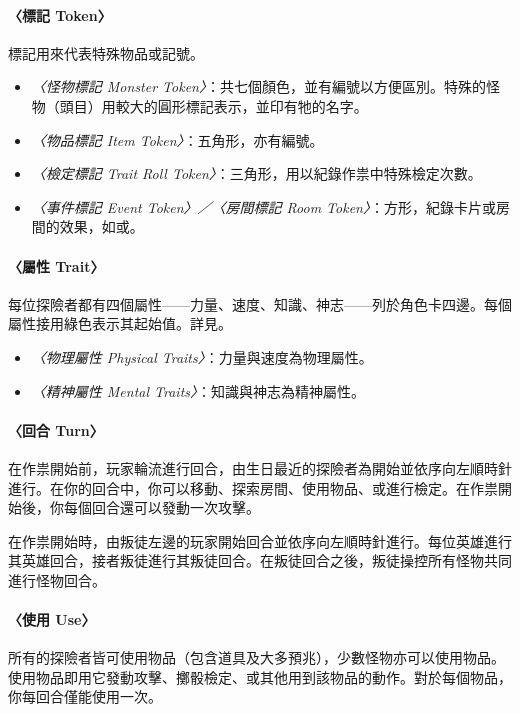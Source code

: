 \paragraph{〈標記 Token〉}
標記用來代表特殊物品或記號。

\begin{itemize}
  \item \textit{〈怪物標記 Monster Token〉}：共七個顏色，並有編號以方便區別。特殊的怪物（頭目）用較大的圓形標記表示，並印有牠的名字。
  \item \textit{〈物品標記 Item Token〉}：五角形，亦有編號。
  \item \textit{〈檢定標記 Trait Roll Token〉}：三角形，用以紀錄作祟中特殊檢定次數。
  \item \textit{〈事件標記 Event Token〉／〈房間標記 Room Token〉}：方形，紀錄卡片或房間的效果，如或。
\end{itemize}

\paragraph{〈屬性 Trait〉}
每位探險者都有四個屬性——力量、速度、知識、神志——列於角色卡四邊。每個屬性接用綠色表示其起始值。詳見。

\begin{itemize}
  \item \textit{〈物理屬性 Physical Traits〉}：力量與速度為物理屬性。
  \item \textit{〈精神屬性 Mental Traits〉}：知識與神志為精神屬性。
\end{itemize}

\paragraph{〈回合 Turn〉}
在作祟開始前，玩家輪流進行回合，由生日最近的探險者為開始並依序向左順時針進行。在你的回合中，你可以移動、探索房間、使用物品、或進行檢定。在作祟開始後，你每個回合還可以發動一次攻擊。

在作祟開始時，由叛徒左邊的玩家開始回合並依序向左順時針進行。每位英雄進行其英雄回合，接者叛徒進行其叛徒回合。在叛徒回合之後，叛徒操控所有怪物共同進行怪物回合。

\paragraph{〈使用 Use〉}
所有的探險者皆可使用物品（包含道具及大多預兆），少數怪物亦可以使用物品。使用物品即用它發動攻擊、擲骰檢定、或其他用到該物品的動作。對於每個物品，你每回合僅能使用一次。

